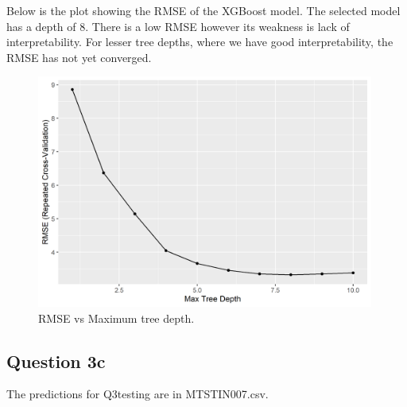 \documentclass[
]{article}
\begin{document}
Below is the plot showing the RMSE of the XGBoost model. The selected
model has a depth of 8. There is a low RMSE however its weakness is lack
of interpretability. For lesser tree depths, where we have good
interpretability, the RMSE has not yet converged.

\begin{figure}
\centering
\includegraphics[width=4.36458in,height=\textheight]{rmse_xgboost.png}
\caption{RMSE vs Maximum tree depth.}
\end{figure}

\hypertarget{question-3c}{%
\subsection{Question 3c}\label{question-3c}}

The predictions for Q3testing are in MTSTIN007.csv.
\end{document}
